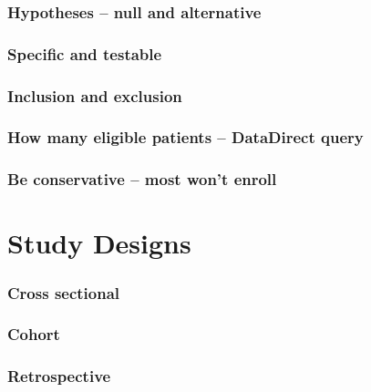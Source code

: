 \documentclass[
]{book}
\begin{document}
\hypertarget{hypotheses-null-and-alternative}{%
\subsubsection{Hypotheses -- null and alternative}\label{hypotheses-null-and-alternative}}

\hypertarget{specific-and-testable}{%
\subsubsection{Specific and testable}\label{specific-and-testable}}

\hypertarget{inclusion-and-exclusion}{%
\subsubsection{Inclusion and exclusion}\label{inclusion-and-exclusion}}

\hypertarget{how-many-eligible-patients-datadirect-query}{%
\subsubsection{How many eligible patients -- DataDirect query}\label{how-many-eligible-patients-datadirect-query}}

\hypertarget{be-conservative-most-wont-enroll}{%
\subsubsection{Be conservative -- most won't enroll}\label{be-conservative-most-wont-enroll}}

\hypertarget{study-designs}{%
\section{Study Designs}\label{study-designs}}

\hypertarget{cross-sectional}{%
\subsubsection{Cross sectional}\label{cross-sectional}}

\hypertarget{cohort}{%
\subsubsection{Cohort}\label{cohort}}

\hypertarget{retrospective}{%
\subsubsection{Retrospective}\label{retrospective}}
\end{document}

